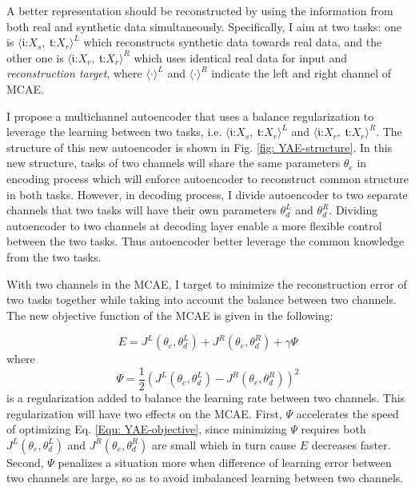\documentclass{iitthesis}
\begin{document}
A better representation should be reconstructed by using the information from both real and synthetic data simultaneously. Specifically, I aim at two tasks: one is $\langle\mathfrak{i}\text{:}X_{s},\:\mathfrak{t}\text{:}X_{r}\rangle^L$ which reconstructs synthetic data towards real data, and the other
one is $\langle\mathfrak{i}\text{:}X_{r},\:\mathfrak{t}\text{:}X_{r}\rangle^R$ which uses identical real data for input and \textit{reconstruction target}, where $\langle\cdot\rangle^{L}$ and $\langle\cdot\rangle^{R}$
indicate the left and right channel of MCAE.

 I propose a multichannel autoencoder that uses a balance regularization to leverage the learning between two tasks, i.e. $\langle\mathfrak{i}\text{:}X_{s},\:\mathfrak{t}\text{:}X_{r}\rangle^L$ and $\langle\mathfrak{i}\text{:}X_{r},\:\mathfrak{t}\text{:}X_{r}\rangle^R$. The structure of this new autoencoder is shown in Fig. \ref{fig: YAE-structure}. In this new structure, tasks of two channels will share the same parameters $\theta_{e}$ in encoding process which will enforce autoencoder to reconstruct common structure in both tasks. However, in decoding process, I divide autoencoder to two separate channels that two tasks will have their own parameters $\theta_{d}^{L}$ and $\theta_{d}^{R}$. Dividing autoencoder to two channels at decoding layer enable a more flexible control between the two tasks. Thus autoencoder better leverage the common knowledge from the two tasks. 

With two channels in the MCAE, I target to minimize the reconstruction error of two tasks together while taking into account the balance between two channels. The new objective function of the MCAE is given in the following:

\begin{equation}
E=J^{L}(\theta_{e},\theta_{d}^{L})+J^{R}(\theta_{e},\theta_{d}^{R})+\gamma\Psi\label{Equ: YAE-objective}
\end{equation}
where 
\begin{equation}
\Psi=\frac{1}{2}(J^{L}(\theta_{e},\theta_{d}^{L})-J^{R}(\theta_{e},\theta_{d}^{R}))^{2}
\end{equation}
is a regularization added to balance the learning rate between two channels. This regularization will have two effects on the MCAE. First, $\Psi$ accelerates the speed of optimizing Eq. \ref{Equ: YAE-objective}, since minimizing $\Psi$ requires both $J^{L}(\theta_{e},\theta_{d}^{L})$ and $J^{R}(\theta_{e},\theta_{d}^{R})$ are small which in turn cause $E$ decreases faster. Second, $\Psi$ penalizes a situation more when difference of learning error between two channels are large, so as to avoid imbalanced learning between two channels.
\end{document}

